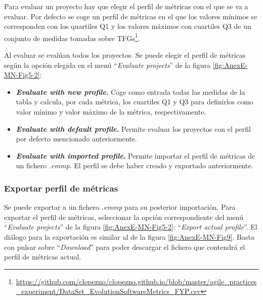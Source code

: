 Para evaluar un proyecto hay que elegir el perfil de métricas con el que se va a evaluar. Por defecto se coge un perfil de métricas en el que los valores mínimos se corresponden con los quartiles Q1 y los valores máximos con cuartiles Q3 de un conjunto de medidas tomadas sobre TFGs\footnote{\url{https://github.com/clopezno/clopezno.github.io/blob/master/agile_practices_experiment/DataSet_EvolutionSoftwareMetrics_FYP.csv}}\cite{lopez_portal_2019}.

Al evaluar se evalúan todos los proyectos. Se puede elegir el perfil de métricas según la opción elegida en el menú ``\textit{Evaluate projects}'' de la figura \ref{fig:AnexE-MN-Fig5-2}:
\begin{itemize}
	\item \textbf{\textit{Evaluate with new profile}.} Coge como entrada todas las medidas de la tabla y calcula, por cada métrica, los cuartiles Q1 y Q3 para definirlos como valor mínimo y valor máximo de la métrica, respectivamente.
	\item \textbf{\textit{Evaluate with default profile}.} Permite evaluar los proyectos con el perfil por defecto mencionado anteriormente.
	\item \textbf{\textit{Evaluate with imported profile}.} Permite importar el perfil de métricas de un fichero \textit{.emmp}. El perfil se debe haber creado y exportado anteriormente.
\end{itemize}
\subsubsection{Exportar perfil de métricas}
Se puede exportar a un fichero \textit{.emmp} para su posterior importación. Para exportar el perfil de métricas, seleccionar la opción correspondiente del menú ``\textit{Evaluate projects}'' de la figura \ref{fig:AnexE-MN-Fig5-2}: ``\textit{Export actual profile}''. El diálogo para la exportación es similar al de la figura \ref{fig:AnexE-MN-Fig9}. Basta con pulsar sobre ``\textit{Download}'' para poder descargar el fichero que contendrá el perfil de métricas actual.